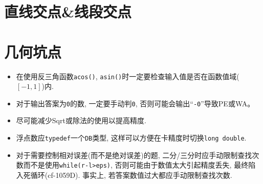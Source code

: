 \section{直线交点\&线段交点}


\section{几何坑点}
\begin{itemize}
\item
在使用反三角函数\texttt{acos()}, \texttt{asin()}时一定要检查输入值是否在函数值域($[-1,1]$)内.

\item
对于输出答案为\texttt{0}的数, 一定要手动判\texttt{0}, 否则可能会输出``\texttt{-0}''导致PE或WA。

\item
尽可能减少Sqrt或除法的使用以提高精度.

\item
浮点数应\texttt{typedef}一个\texttt{DB}类型, 这样可以方便在卡精度时切换\texttt{long double}.

\item
对于需要控制相对误差(而不是绝对误差)的题, 二分/三分时应手动限制查找次数而不是使用\texttt{while(r-l>eps)}, 否则可能由于数值太大引起精度丢失, 最终陷入死循环(cf-1059D).
事实上, 若答案数值过大都应手动限制查找次数.
\end{itemize}
